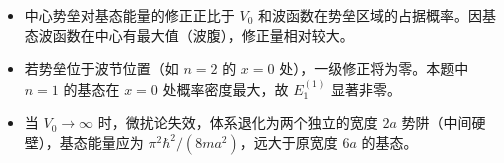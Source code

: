 \begin{insightbox}[物理图像]
\begin{itemize}
    \item 中心势垒对基态能量的修正正比于 $V_0$ 和波函数在势垒区域的占据概率。因基态波函数在中心有最大值（波腹），修正量相对较大。
    \item 若势垒位于波节位置（如 $n=2$ 的 $x=0$ 处），一级修正将为零。本题中 $n=1$ 的基态在 $x=0$ 处概率密度最大，故 $E_1^{(1)}$ 显著非零。
    \item 当 $V_0\to\infty$ 时，微扰论失效，体系退化为两个独立的宽度 $2a$ 势阱（中间硬壁），基态能量应为 $\pi^2\hbar^2/(8ma^2)$，远大于原宽度 $6a$ 的基态。
\end{itemize}
\end{insightbox}
